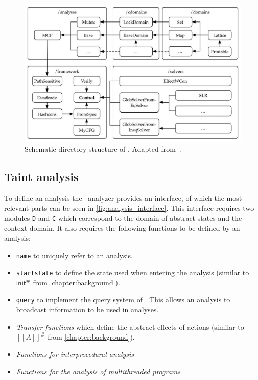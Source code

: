   \begin{figure}
    \centering
    \includegraphics{../figures/goblint_structure_detailed.jpg}
    \caption[Schematic directory structure of \gob. Adapted from~\parencite{apinis2014frameworks}.]{Schematic directory structure of \gob. Adapted from~\parencite{apinis2014frameworks}.}
    \label{fig:gob_structure_detail}
  \end{figure}

    \subsection{Taint analysis}\label{sec:implTaint}
      To define an analysis the \gob\ analyzer provides an interface, of which the most relevant parts can be seen in \autoref{fig:analysis_interface}. This interface requires two modules \texttt{D} and \texttt{C} which correspond to the domain of abstract states and the context domain. It also requires the following functions to be defined by an analysis: 
      \begin{itemize}
        \item \texttt{name} to uniquely refer to an analysis.
        \item \texttt{startstate} to define the state used when entering the analysis (similar to $\textsf{init}^{\#}$ from \autoref{chapter:background}).
        \item \texttt{query} to implement the query system of \gob. This allows an analysis to broadcast information to be used in analyses.
        \item \textit{Transfer functions} which define the abstract effects of actions (similar to $[\![A]\!]^{\#}$ from \autoref{chapter:background}).
        \item \textit{Functions for interprocedural analysis}
        \item \textit{Functions for the analysis of multithreaded programs}
      \end{itemize}

